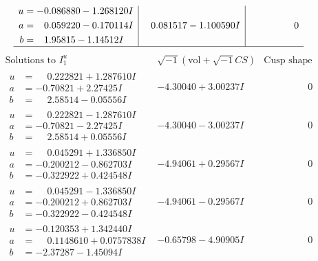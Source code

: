 \documentclass[1p]{elsarticle_modified}
\theoremstyle{definition}
\newcommand{\I}{\sqrt{-1}}
\begin{document}
$$\begin{array}{c|c|c}
\begin{aligned}
u &= -0.086880 - 1.268120 I \\
a &= \phantom{-}0.059220 - 0.170114 I \\
b &= \phantom{-}1.95815 - 1.14512 I\end{aligned}
 & \phantom{-}0.081517 - 1.100590 I & \phantom{-0.000000 } 0\\
 \hline 
 \end{array}$$\newpage$$\begin{array}{c|c|c}  
\text{Solutions to }I^u_{1}& \I (\text{vol} + \sqrt{-1}CS) & \text{Cusp shape}\\
 \hline 
\begin{aligned}
u &= \phantom{-}0.222821 + 1.287610 I \\
a &= -0.70821 + 2.27425 I \\
b &= \phantom{-}2.58514 - 0.05556 I\end{aligned}
 & -4.30040 + 3.00237 I & \phantom{-0.000000 } 0 \\ \hline\begin{aligned}
u &= \phantom{-}0.222821 - 1.287610 I \\
a &= -0.70821 - 2.27425 I \\
b &= \phantom{-}2.58514 + 0.05556 I\end{aligned}
 & -4.30040 - 3.00237 I & \phantom{-0.000000 } 0 \\ \hline\begin{aligned}
u &= \phantom{-}0.045291 + 1.336850 I \\
a &= -0.200212 - 0.862703 I \\
b &= -0.322922 + 0.424548 I\end{aligned}
 & -4.94061 + 0.29567 I & \phantom{-0.000000 } 0 \\ \hline\begin{aligned}
u &= \phantom{-}0.045291 - 1.336850 I \\
a &= -0.200212 + 0.862703 I \\
b &= -0.322922 - 0.424548 I\end{aligned}
 & -4.94061 - 0.29567 I & \phantom{-0.000000 } 0 \\ \hline\begin{aligned}
u &= -0.120353 + 1.342440 I \\
a &= \phantom{-}0.1148610 + 0.0757838 I \\
b &= -2.37287 - 1.45094 I\end{aligned}
 & -0.65798 - 4.90905 I & \phantom{-0.000000 } 0 \\ \hline\begin{aligned}

\end{aligned}
\end{array}$$
\end{document}
